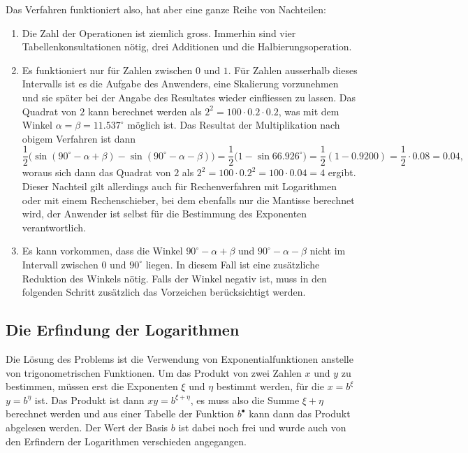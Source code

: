 Das Verfahren funktioniert also, hat aber eine ganze Reihe von Nachteilen:
\begin{enumerate}
\item
Die Zahl der Operationen ist ziemlich gross.
Immerhin sind vier Tabellenkonsultationen nötig, drei Additionen und die
Halbierungsoperation.
\item
Es funktioniert nur für Zahlen zwischen $0$ und $1$.
Für Zahlen ausserhalb dieses Intervalls ist es die Aufgabe des
Anwenders, eine Skalierung vorzunehmen und sie später bei der Angabe
des Resultates wieder einfliessen zu lassen.
Das Quadrat von $2$ kann berechnet werden als
\(2^2 = 100 \cdot 0.2\cdot 0.2\), was mit dem Winkel
$\alpha=\beta=11.537^\circ$ möglich ist. 
Das Resultat der Multiplikation nach obigem Verfahren ist dann 
\[
\frac12\bigl(
\sin(90^\circ-\alpha+\beta)
-
\sin(90^\circ-\alpha-\beta)
\bigr)
=
\frac12\bigl(
1-
\sin 66.926^\circ
\bigr)
=
\frac12( 1-0.9200)
=
\frac12\cdot 0.08=0.04,
\]
woraus sich dann das Quadrat von $2$ als
$2^2 = 100\cdot 0.2^2 = 100\cdot 0.04 = 4$
ergibt.
Dieser Nachteil gilt allerdings auch für Rechenverfahren mit Logarithmen
oder mit einem Rechenschieber, bei dem ebenfalls nur die Mantisse
berechnet wird, der Anwender ist selbst für die Bestimmung des Exponenten
verantwortlich.
\item
Es kann vorkommen, dass die Winkel $90^\circ-\alpha+\beta$
und $90^\circ-\alpha-\beta$ nicht im Intervall zwischen $0$ und $90^\circ$
liegen.
In diesem Fall ist eine zusätzliche Reduktion des Winkels nötig.
Falls der Winkel negativ ist, muss in den folgenden Schritt zusätzlich
das Vorzeichen berücksichtigt werden.
\end{enumerate}

%
%
\subsection{Die Erfindung der Logarithmen}
Die Lösung des Problems ist die Verwendung von Exponentialfunktionen 
anstelle von trigonometrischen Funktionen.
Um das Produkt von zwei Zahlen $x$ und $y$ zu bestimmen, müssen erst
die Exponenten $\xi$ und $\eta$ bestimmt werden, für die $x=b^\xi$
$y=b^\eta$ ist.
Das Produkt ist dann $xy = b^{\xi+\eta}$, es muss also die Summe
$\xi+\eta$ berechnet werden und aus einer Tabelle der Funktion
$b^\bullet$ kann dann das Produkt abgelesen werden.
Der Wert der Basis $b$ ist dabei noch frei und wurde auch von
den Erfindern der Logarithmen verschieden angegangen.

%
%
